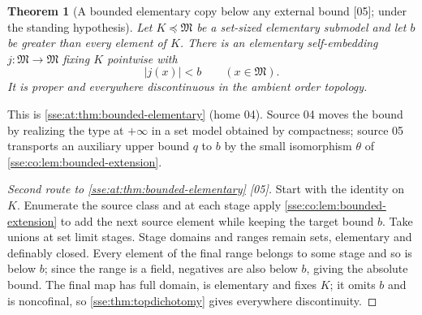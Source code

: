 \documentclass[11pt,a4paper]{article}
\numberwithin{equation}{section}
\theoremstyle{plain}
\newtheorem{theorem}{Theorem}[section]
\theoremstyle{definition}
\theoremstyle{remark}
\newcommand{\src}[1]{\textup{\textsf{\small[#1]}}}%
\begin{document}
\begin{theorem}[A bounded elementary copy below any external bound \src{05}; under the standing hypothesis]\label{sse:co:thm:bounded-elementary}
Let $K\preccurlyeq\mathfrak M$ be a set-sized elementary submodel and let
$b$ be greater than every element of $K$. There is an elementary
self-embedding $j:\mathfrak M\to\mathfrak M$ fixing $K$ pointwise with
\[
 |j(x)|<b\qquad(x\in\mathfrak M).
\]
It is proper and everywhere discontinuous in the ambient order topology.
\end{theorem}
This is \cref{sse:at:thm:bounded-elementary} (home 04). Source 04 moves the
bound by realizing the type at $+\infty$ in a set model obtained by
compactness; source 05 transports an auxiliary upper bound $q$ to $b$ by the
small isomorphism $\theta$ of \cref{sse:co:lem:bounded-extension}.
\begin{proof}[Second route to \cref{sse:at:thm:bounded-elementary} \src{05}]
Start with the identity on $K$. Enumerate the source class and at each stage
apply \cref{sse:co:lem:bounded-extension} to add the next source element while
keeping the target bound $b$. Take unions at set limit stages. Stage domains
and ranges remain sets, elementary and definably closed. Every element of the
final range belongs to some stage and so is below $b$; since the range is a
field, negatives are also below $b$, giving the absolute bound. The final map
has full domain, is elementary and fixes $K$; it omits $b$ and is noncofinal,
so \cref{sse:thm:topdichotomy} gives everywhere discontinuity.
\end{proof}
\end{document}

